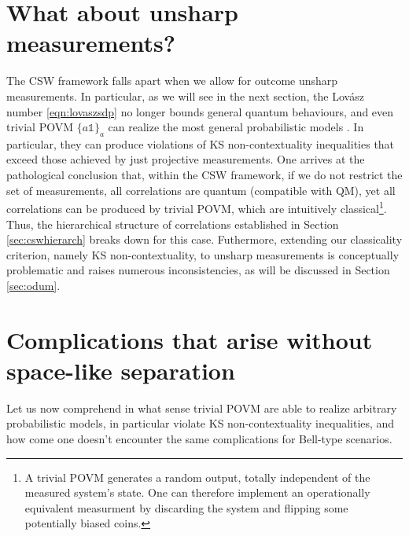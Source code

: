 \section{What about unsharp measurements?}
\label{sec:cswunsharp}
The CSW framework falls apart when we allow for outcome unsharp measurements. In particular, as we will see in the next section, the Lovász number \ref{eqn:lovaszsdp} no longer bounds general quantum behaviours, and even trivial POVM $\{a\mathbb{1}\}_{a}$ can realize the most general probabilistic models \cite{Kunjwal2019}. In particular, they can produce violations of KS non-contextuality inequalities that exceed those achieved by just projective measurements. One arrives at the pathological conclusion that, within the CSW framework, if we do not restrict the set of measurements, all correlations are quantum (compatible with QM), yet all correlations can be produced by trivial POVM, which are intuitively classical\footnote{A trivial POVM generates a random output, totally independent of the measured system's state. One can therefore implement an operationally equivalent measurment by discarding the system and flipping some potentially biased coins.}. Thus, the hierarchical structure of correlations established in Section \ref{sec:cswhierarch} breaks down for this case. Futhermore, extending our classicality criterion, namely KS non-contextuality, to unsharp measurements is conceptually problematic and raises numerous inconsistencies, as will be discussed in Section \ref{sec:odum}.

\section{Complications that arise without space-like separation}
\label{sec:complicationscont}
Let us now comprehend in what sense trivial POVM are able to realize arbitrary probabilistic models, in particular violate KS non-contextuality inequalities, and how come one doesn't encounter the same complications for Bell-type scenarios. 

